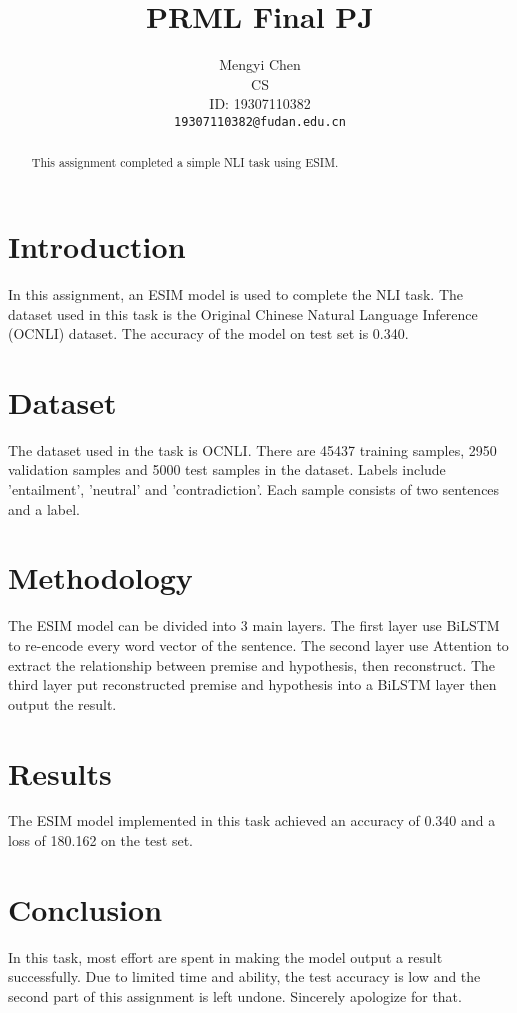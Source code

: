 \documentclass{article}
\title{PRML Final PJ %
}
\author{%
  Mengyi Chen \\ %
  CS \\ %
  ID: 19307110382 \\
  \texttt{19307110382@fudan.edu.cn} \\
}
\begin{document}
\maketitle

\begin{abstract}
   This assignment completed a simple NLI task using ESIM.
\end{abstract}

\section{Introduction}
In this assignment, an ESIM model is used to complete the NLI task. The dataset used in this task is the Original Chinese Natural Language Inference (OCNLI) dataset. The accuracy of the model on test set is 0.340.
 
\section{Dataset}
The dataset used in the task is OCNLI. There are 45437 training samples, 2950 validation samples and 5000 test samples in the dataset. Labels include 'entailment', 'neutral' and 'contradiction'. Each sample consists of two sentences and a label.


\section{Methodology}
The ESIM model can be divided into 3 main layers. The first layer use BiLSTM to re-encode every word vector of the sentence. The second layer use Attention to extract the relationship between premise and hypothesis, then reconstruct. The third layer put reconstructed premise and hypothesis into a BiLSTM layer then output the result. 
 
\section{Results}
The ESIM model implemented in this task achieved an accuracy of 0.340 and a loss of 180.162 on the test set.


\section{Conclusion}
In this task, most effort are spent in making the model output a result successfully. Due to limited time and ability, the test accuracy is low and the second part of this assignment is left undone. Sincerely apologize for that.
\end{document}
